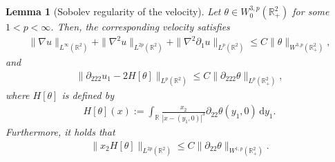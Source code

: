 \documentclass[10pt]{amsart}
\newtheorem{lemma}[theorem]{Lemma}
\theoremstyle{definition}
\theoremstyle{remark}
\numberwithin{equation}{section}
\newcommand{\ud}{\mathrm{d}}
\newcommand{\rd}{\partial}
\newcommand{\0}{\emptyset}
\newcommand{\tht}{\theta}
\newcommand{\bbR}{\mathbb R}
\begin{document}
	\begin{lemma}[Sobolev regularity of the velocity]\label{lem:vel-W3p}
		Let $\tht \in W^{3,p}_0(\bbR^2_{+})$ for some $1 < p < \infty$. Then, the corresponding velocity  satisfies \begin{equation}\label{eq:vel-reg}
			\begin{aligned}
				\| \nabla u \|_{L^{\infty}(\bbR^2)} + \| \nabla^2 u \|_{L^{2p}(\bbR^2)} + \| \nabla^2 \partial_1 u \|_{L^{p}(\bbR^{2})} \leq C \| \tht \|_{W^{3,p}(\bbR^2_{+})},
			\end{aligned}
		\end{equation} and \begin{equation}\label{eq:vel-sing}
			\begin{split}
				\| \rd_{222}u_1 - 2H[\tht] \|_{L^{p}(\bbR^{2})} \leq C\| \rd_{222} \tht \|_{L^p(\bbR^2_{+})},
			\end{split}
		\end{equation} where $H[\tht]$ is defined by \begin{equation}\label{eq:def-H}
			\begin{aligned}
				H[\tht](x) := \int_{\bbR} \frac{x_2}{|x-(y_1,0)|^3} \partial_{22} \tht(y_1,0) \,\ud y_1.
			\end{aligned}
		\end{equation} Furthermore, it holds that \begin{equation}\label{eq:H2p}
			\begin{aligned}
				\| x_2 H[\tht] \|_{L^{2p}(\bbR^2)}  \leq C \| \partial_{22} \tht \|_{W^{1,p}(\bbR^2_{+})}.
			\end{aligned}
		\end{equation}
	\end{lemma}
	
\end{document}
